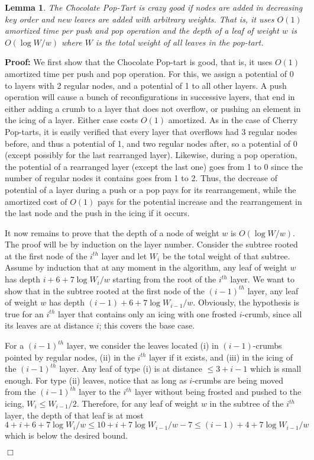 \documentclass[11pt]{article}
\newtheorem{lemma}[theorem]{Lemma}
\newenvironment{proof}{\noindent\textbf{Proof: }\ignorespaces}
  {\hspace*{\fill}$\Box$\medskip}
\begin{document}
\begin{lemma}\label{lem:chocolate-pop-tart}
The Chocolate Pop-Tart is crazy good if nodes are added in decreasing
key order and new leaves are added with arbitrary weights.
That is, it uses $O(1)$ amortized time per push and pop operation and
the depth of a leaf of weight $w$ is $O(\log W/w)$ where $W$ is the
total weight of all leaves in the pop-tart.
\end{lemma}
\begin{proof}
We first show that the Chocolate Pop-tart is good, that is, it uses
$O(1)$ amortized time per push and pop operation.
For this, we assign a potential of 0 to layers with 2 regular nodes,
and a potential of 1 to all other layers. 
A push operation will cause a bunch of reconfigurations in successive
layers, that end in either adding a crumb to a layer that does not
overflow, or pushing an element in the icing of a layer. Either case
costs $O(1)$ amortized. As in the case of Cherry Pop-tarts, it is
easily verified that every layer that overflows had 3 regular nodes
before, and thus a potential of 1, and two regular nodes after, so a
potential of 0 (except possibly for the last rearranged layer).
Likewise, during a pop operation, the potential of a rearranged layer
(except the last one) goes from 1 to 0 since the number of regular
nodes it contains goes from 1 to 2.
Thus, the decrease of potential of a layer during a push or a pop pays
for its rearrangement, while the amortized cost of $O(1)$ pays for the
potential increase and the rearrangement in the last node and the push
in the icing if it occurs.

It now remains to prove that the depth of a node of weight $w$ is
$O(\log W/w)$. 
The proof will be by induction on the layer number. Consider the subtree
rooted at the first node of the $i^{th}$ layer and let $W_i$ be the
total weight of that subtree.
Assume by induction that at any moment in the algorithm, any leaf of weight $w$ has
depth $i+6+7\log{W_i/w}$ starting from the
root of the $i^{th}$ layer. 
We want to show that in the subtree rooted at the first node of the
$(i-1)^{th}$ layer, any leaf of weight $w$ has depth 
$(i-1)+6+7\log{W_{i-1}/w}$.
Obviously, the hypothesis is true for an $i^{th}$ layer 
that contains only an icing with one frosted $i$-crumb,
since all its leaves are at distance $i$;
this covers the base case.

For a $(i-1)^{th}$ layer, we consider the leaves located 
(i) in $(i-1)$-crumbs pointed by regular nodes, 
(ii) in the $i^{th}$ layer if it exists, and 
(iii) in the icing of the $(i-1)^{th}$ layer.
Any leaf of type (i) is at distance $\leq 3+i-1$ which is small enough.
For type (ii) leaves, notice that as long as $i$-crumbs are being moved
from the $(i-1)^{th}$ layer to the $i^{th}$ layer without being
frosted and pushed to the icing, $W_i \leq W_{i-1}/2$. Therefore, for
any leaf of weight $w$ in the subtree of the $i^{th}$ layer, the
depth of that leaf is at most 
$$4 + i + 6 +7\log {W_i/w} \leq 10+i+7\log {W_{i-1}/w} - 7
\leq (i-1) + 4 + 7\log {W_{i-1}/w}$$
which is below the desired bound.


\end{proof}
\end{document}
